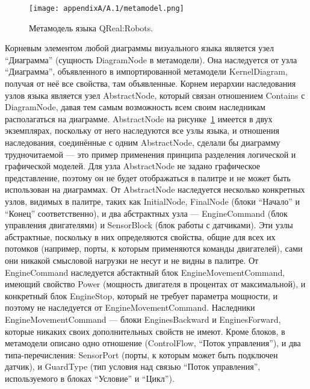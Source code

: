 \begin{figure} [ht]
	\begin{center}
		\texttt{[image: appendixA/A.1/metamodel.png]}
		\caption{Метамодель языка QReal:Robots.}
		\label{image:metamodel}
	\end{center}
\end{figure}

Корневым элементом любой диаграммы визуального языка является узел "`Диаграмма"' 
(сущность DiagramNode в метамодели). Она наследуется от узла "`Диаграмма"', объявленного 
в импортированной метамодели KernelDiagram, получая от неё все свойства, там объявленные. 
Корнем иерархии наследования узлов языка является узел AbstractNode, который связан 
отношением Contains с DiagramNode, давая тем самым возможность всем своим наследникам 
располагаться на диаграмме. AbstractNode на рисунке~\ref{image:metamodel} имеется 
в двух экземплярах, поскольку от него наследуются все узлы языка, и отношения наследования, 
соединённые с одним AbstractNode, сделали бы диаграмму трудночитаемой --- это пример 
применения принципа разделения логической и графической моделей. Для узла AbstractNode 
не задано графическое представление, поэтому он не будет отображаться в палитре и 
не может быть использован на диаграммах. От AbstractNode наследуется несколько конкретных 
узлов, видимых в палитре, таких как InitialNode, FinalNode (блоки "`Начало"' и "`Конец"' 
соответственно), и два абстрактных узла --- EngineCommand (блок управления двигателями) 
и SensorBlock (блок работы с датчиками). Эти узлы абстрактные, поскольку в них определяются 
свойства, общие для всех их потомков (например, порты, к которым применяются команды 
двигателей), сами они никакой смысловой нагрузки не несут и не видны в палитре. От 
EngineCommand наследуется абстактный блок EngineMovementCommand, имеющий свойство 
Power (мощность двигателя в процентах от максимальной), и конкретный блок EngineStop, 
который не требует параметра мощности, и поэтому не наследуется от EngineMovementCommand. 
Наследники EngineMovementCommand --- блоки EnginesBackward и EnginesForward, которые 
никаких своих дополнительных свойств не имеют. Кроме блоков, в метамодели описано 
одно отношение (ControlFlow, "`Поток управления"'), и два типа-перечисления: SensorPort 
(порты, к которым может быть подключен датчик), и GuardType (тип условия над связью 
"`Поток управления"', используемого в блоках "`Условие"' и "`Цикл"').


